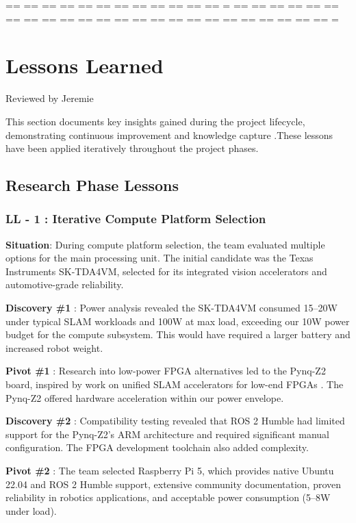     == == == == == == == == == == == ==
    = %
      == == == == == == == == == == == == == == == == == == == == == == == ==
    =

\section {
  Lessons Learned
}
    Reviewed by Jeremie

        This section documents key insights gained during the project lifecycle,
    demonstrating continuous improvement and knowledge capture
        .These lessons have been applied iteratively throughout the project
            phases.

\subsection {
  Research Phase Lessons
}

\subsubsection { LL - 1 : Iterative Compute Platform Selection }

\textbf{Situation}: During compute platform selection, the team evaluated multiple options for the main processing unit. The initial candidate was the Texas Instruments SK-TDA4VM, selected for its integrated vision accelerators and automotive-grade reliability.

\textbf{
  Discovery \#1
}: Power analysis revealed the SK-TDA4VM consumed 15--20W under typical SLAM workloads and 100W at max load, exceeding our 10W power budget for the compute subsystem. This would have required a larger battery and increased robot weight.

\textbf{
  Pivot \#1
}: Research into low-power FPGA alternatives led to the Pynq-Z2 board, inspired by work on unified SLAM accelerators for low-end FPGAs \parencite{sugiura_fpga_slam}. The Pynq-Z2 offered hardware acceleration within our power envelope.

\textbf{
  Discovery \#2
}: Compatibility testing revealed that ROS 2 Humble had limited support for the Pynq-Z2's ARM architecture and required significant manual configuration. The FPGA development toolchain also added complexity.

\textbf{
  Pivot \#2
}: The team selected Raspberry Pi 5, which provides native Ubuntu 22.04 and ROS 2 Humble support, extensive community documentation, proven reliability in robotics applications, and acceptable power consumption (5--8W under load).

